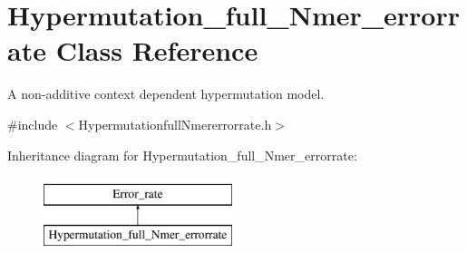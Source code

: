 \hypertarget{classHypermutation__full__Nmer__errorrate}{}\section{Hypermutation\+\_\+full\+\_\+\+Nmer\+\_\+errorrate Class Reference}
\label{classHypermutation__full__Nmer__errorrate}


A non-\/additive context dependent hypermutation model.  




{\ttfamily \#include $<$Hypermutationfull\+Nmererrorrate.\+h$>$}

Inheritance diagram for Hypermutation\+\_\+full\+\_\+\+Nmer\+\_\+errorrate\+:\begin{figure}[H]
\begin{center}
\leavevmode
\includegraphics[height=2.000000cm]{dc/de0/classHypermutation__full__Nmer__errorrate}
\end{center}
\end{figure}
